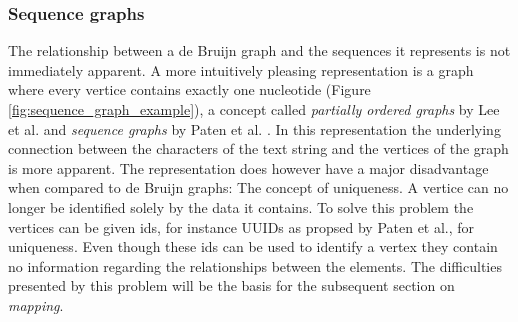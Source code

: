 \documentclass[thesis.tex]{subfiles}
\begin{document}
\subsubsection{Sequence graphs}
\label{sec:sequence_graphs}
The relationship between a de Bruijn graph and the sequences it represents is not immediately apparent. A more intuitively pleasing representation is a graph where every vertice contains exactly one nucleotide (Figure \ref{fig:sequence_graph_example}), a concept called \textit{partially ordered graphs} by Lee et al. \cite{improved_genome_inference_in_the_mhc_using_a_population_reference_graph} and \textit{sequence graphs} by Paten et al. \cite{mapping_to_a_reference_genome_structure}. In this representation the underlying connection between the characters of the text string and the vertices of the graph is more apparent. The representation does however have a major disadvantage when compared to de Bruijn graphs: The concept of uniqueness. A vertice can no longer be identified solely by the data it contains. To solve this problem the vertices can be given ids, for instance UUIDs as propsed by Paten et al., for uniqueness. Even though these ids can be used to identify a vertex they contain no information regarding the relationships between the elements. The difficulties presented by this problem will be the basis for the subsequent section on \textit{mapping}. 
\end{document}
